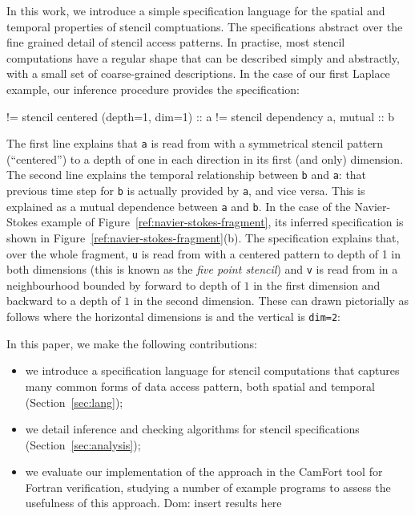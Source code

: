 \documentclass[9pt]{sigplanconf}
\newcommand{\dnote}[1]{\textcolor{darkpurple}{Dom: #1}}
\theoremstyle{definition}
\begin{document}
In this work, we introduce a simple specification language for the
spatial and temporal properties of stencil comptuations. The
specifications abstract over the fine grained detail of stencil access
patterns.  In practise, most stencil computations have a regular shape
that can be described simply and abstractly, with a small set of
coarse-grained descriptions. In the case of our first Laplace example,
our inference procedure provides the specification:
%
\begin{SpecVerbatim}
!=  stencil centered (depth=1, dim=1) :: a
!=  stencil dependency a, mutual       :: b
\end{SpecVerbatim}
%
The first line explains that \texttt{a} is read from with a
symmetrical stencil pattern (``centered'') to a depth of one in each
direction in its first (and only) dimension.  The second line explains
the temporal relationship between \texttt{b} and \texttt{a}: that
previous time step for \texttt{b} is actually provided by \texttt{a},
and vice versa. This is explained as a mutual dependence between
\texttt{a} and \texttt{b}. In the case of the Navier-Stokes example of
Figure~\ref{ref:navier-stokes-fragment}, its inferred specification is shown
in Figure~\ref{ref:navier-stokes-fragment}(b). The 
specification explains that, over the whole fragment, \texttt{u} is
read from with a centered pattern to depth of 1 in both dimensions
(this is known as the \emph{five point stencil}) and \texttt{v}
is read from in a neighbourhood bounded by forward to depth of $1$ in
the first dimension and backward to a depth of $1$ in the second
dimension. These can drawn pictorially as follows where the horizontal
dimensions is  and the vertical is \texttt{dim=2}:

\begin{center}
\end{center}


In this paper, we make the following contributions:
%
\begin{itemize}
\item we introduce a specification language for
stencil computations that captures many common forms
of data access pattern, both spatial and temporal (Section~\ref{sec:lang});
\item we detail inference and checking
algorithms for stencil specifications (Section~\ref{sec:analysis});
\item we evaluate our implementation of the approach
in the CamFort tool for Fortran verification, studying
a number of example programs to assess the usefulness
of this approach.
\dnote{insert results here}
\end{itemize}
%
\end{document}
